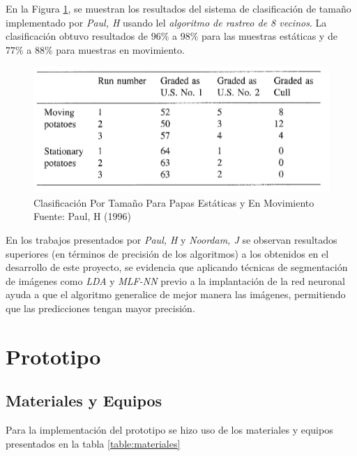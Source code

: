 En la Figura \ref{fig:tabPAUL}, se muestran los resultados del sistema de clasificación de tamaño implementado por \textit{Paul, H} usando lel \textit{algoritmo de rastreo de 8 vecinos}. La clasificación obtuvo resultados de $96\%$ a $98\%$ para las muestras estáticas y de $77\%$ a $88\%$ para muestras en movimiento.

\begin{figure}[ht]
	\centering
	\includegraphics[scale=0.7]{Figs/tabPaul.png}
	\caption{Clasificación Por Tamaño Para Papas Estáticas y En Movimiento  \\ Fuente: Paul, H (1996)}
	\label{fig:tabPAUL}
\end{figure}

En los trabajos presentados por \textit{Paul, H} y \textit{Noordam, J} se observan resultados superiores (en términos de precisión de los algoritmos) a los obtenidos en el desarrollo de este proyecto, se evidencia que aplicando técnicas de segmentación de imágenes como \textit{LDA} y \textit{MLF-NN} previo a la implantación de la red neuronal ayuda a que el algoritmo generalice de mejor manera las imágenes, permitiendo que las predicciones tengan mayor precisión.\\


\newpage
\chapter{Prototipo}

\section{Materiales y Equipos}
Para la implementación del prototipo se hizo uso de los materiales y equipos presentados en la tabla \ref{table:materiales}

